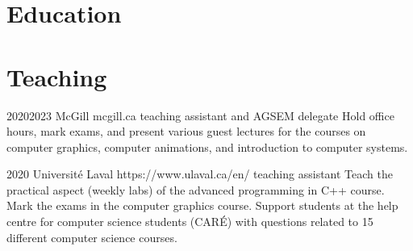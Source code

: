 \documentclass[10pt]{article} %
\begin{document}

\section{Education}







\section{Teaching}
\job
{2020}{2023}
{McGill}
{mcgill.ca}
{teaching assistant and AGSEM delegate}
{Hold office hours, mark exams, and present various guest lectures for the courses on computer graphics, computer animations, and introduction to computer systems.}

\job
{}{2020}
{Université Laval}
{https://www.ulaval.ca/en/}
{teaching assistant}
{Teach the practical aspect (weekly labs) of the advanced programming in C++ course. Mark the exams in the computer graphics course. Support students at the help centre for computer science students (CARÉ) with questions related to 15 different computer science courses.}
\end{document}
